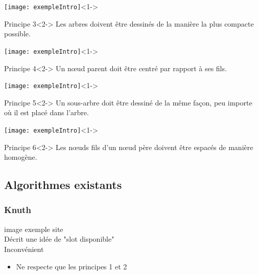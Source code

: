 \begin{frame}
	\begin{center}	
		\texttt{[image: exempleIntro]}<1->\\
		\begin{block}{Principe 3}<2->
		Les arbres doivent être dessinés de la manière la plus compacte possible.
		\end{block}
	\end{center}
\end{frame}

\begin{frame}
	\begin{center}	
		\texttt{[image: exempleIntro]}<1->\\
		\begin{block}{Principe 4}<2->
		Un n\oe{}ud parent doit être centré par rapport à ses fils.
		\end{block}
	\end{center}
\end{frame}

\begin{frame}
	\begin{center}	
		\texttt{[image: exempleIntro]}<1->\\
		\begin{block}{Principe 5}<2->
		Un sous-arbre doit être dessiné de la même façon, peu importe où il est placé dans l'arbre.
		\end{block}
	\end{center}
\end{frame}

\begin{frame}
	\begin{center}	
		\texttt{[image: exempleIntro]}<1->\\
		\begin{block}{Principe 6}<2->
		Les n\oe{}uds fils d'un n\oe{}ud père doivent être espacés de manière homogène.
		\end{block}
	\end{center}
\end{frame}

\subsection{Algorithmes existants}

\begin{frame}
	\frametitle{Knuth}
	image exemple site \\
	Décrit une idée de "slot disponible"\\
	Inconvénient
	\begin{itemize}
		\item Ne respecte que les principes 1 et 2
	\end{itemize}
\end{frame}

